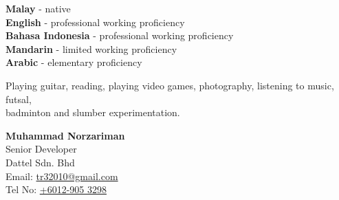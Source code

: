 \documentclass[9pt]{developercv} %
\begin{document}

\begin{minipage}[t]{0.5\textwidth}
	\vspace{-\baselineskip} %

	
	\textbf{Malay} - native\\
	\textbf{English} - professional working proficiency\\
	\textbf{Bahasa Indonesia} - professional working proficiency\\
	\textbf{Mandarin} - limited working proficiency\\
	\textbf{Arabic} - elementary proficiency

\end{minipage}
\hfill
\begin{minipage}[t]{0.4\textwidth}
	\vspace{-\baselineskip} %
	
	
	Playing guitar, reading, playing video games,  photography, listening to music, futsal, \\badminton and slumber experimentation.
\end{minipage}
\hfill
\vspace*{30px}
\begin{minipage}[t]{0.5\textwidth}
	\vspace{-\baselineskip} %
	
	
\textbf{Muhammad Norzariman} \\
Senior Developer \\
Dattel Sdn. Bhd \\
Email: \href{mailto:tr32010@gmail.com}{tr32010@gmail.com} \\
Tel No: \href{tel:+60129053298}{+6012-905 3298}

\end{minipage}

\end{document}
